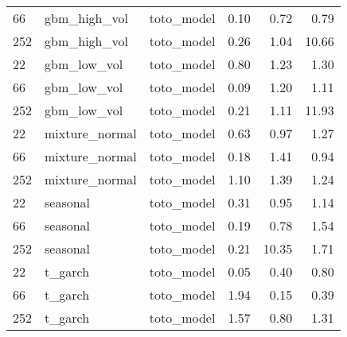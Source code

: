 {\begin{tabular}{lllrrr}
66 & gbm\_high\_vol & toto\_model & 0.10 & 0.72 & 0.79 \\
252 & gbm\_high\_vol & toto\_model & 0.26 & 1.04 & 10.66 \\
\midrule
22 & gbm\_low\_vol & toto\_model & 0.80 & 1.23 & 1.30 \\
66 & gbm\_low\_vol & toto\_model & 0.09 & 1.20 & 1.11 \\
252 & gbm\_low\_vol & toto\_model & 0.21 & 1.11 & 11.93 \\
\midrule
22 & mixture\_normal & toto\_model & 0.63 & 0.97 & 1.27 \\
66 & mixture\_normal & toto\_model & 0.18 & 1.41 & 0.94 \\
252 & mixture\_normal & toto\_model & 1.10 & 1.39 & 1.24 \\
\midrule
22 & seasonal & toto\_model & 0.31 & 0.95 & 1.14 \\
66 & seasonal & toto\_model & 0.19 & 0.78 & 1.54 \\
252 & seasonal & toto\_model & 0.21 & 10.35 & 1.71 \\
\midrule
22 & t\_garch & toto\_model & 0.05 & 0.40 & 0.80 \\
66 & t\_garch & toto\_model & 1.94 & 0.15 & 0.39 \\
252 & t\_garch & toto\_model & 1.57 & 0.80 & 1.31 \\
\bottomrule
\end{tabular}
}